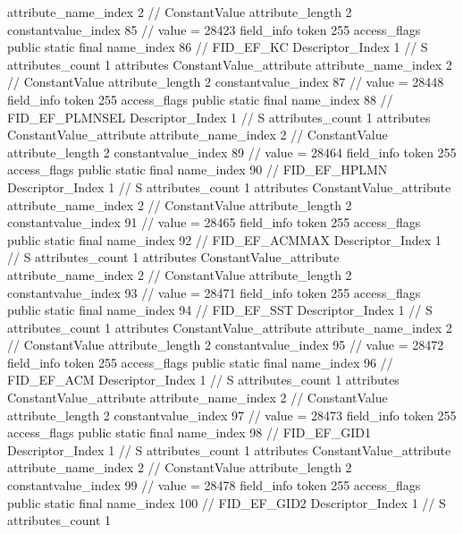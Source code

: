 {{{{{{{					attribute_name_index	2		// ConstantValue
					attribute_length	2
					constantvalue_index	85		// value = 28423
				}
				}
			}
			field_info {
				token	255
				access_flags	public static final
				name_index	86		// FID_EF_KC
				Descriptor_Index	1		// S
				attributes_count	1
				attributes {
				ConstantValue_attribute {
					attribute_name_index	2		// ConstantValue
					attribute_length	2
					constantvalue_index	87		// value = 28448
				}
				}
			}
			field_info {
				token	255
				access_flags	public static final
				name_index	88		// FID_EF_PLMNSEL
				Descriptor_Index	1		// S
				attributes_count	1
				attributes {
				ConstantValue_attribute {
					attribute_name_index	2		// ConstantValue
					attribute_length	2
					constantvalue_index	89		// value = 28464
				}
				}
			}
			field_info {
				token	255
				access_flags	public static final
				name_index	90		// FID_EF_HPLMN
				Descriptor_Index	1		// S
				attributes_count	1
				attributes {
				ConstantValue_attribute {
					attribute_name_index	2		// ConstantValue
					attribute_length	2
					constantvalue_index	91		// value = 28465
				}
				}
			}
			field_info {
				token	255
				access_flags	public static final
				name_index	92		// FID_EF_ACMMAX
				Descriptor_Index	1		// S
				attributes_count	1
				attributes {
				ConstantValue_attribute {
					attribute_name_index	2		// ConstantValue
					attribute_length	2
					constantvalue_index	93		// value = 28471
				}
				}
			}
			field_info {
				token	255
				access_flags	public static final
				name_index	94		// FID_EF_SST
				Descriptor_Index	1		// S
				attributes_count	1
				attributes {
				ConstantValue_attribute {
					attribute_name_index	2		// ConstantValue
					attribute_length	2
					constantvalue_index	95		// value = 28472
				}
				}
			}
			field_info {
				token	255
				access_flags	public static final
				name_index	96		// FID_EF_ACM
				Descriptor_Index	1		// S
				attributes_count	1
				attributes {
				ConstantValue_attribute {
					attribute_name_index	2		// ConstantValue
					attribute_length	2
					constantvalue_index	97		// value = 28473
				}
				}
			}
			field_info {
				token	255
				access_flags	public static final
				name_index	98		// FID_EF_GID1
				Descriptor_Index	1		// S
				attributes_count	1
				attributes {
				ConstantValue_attribute {
					attribute_name_index	2		// ConstantValue
					attribute_length	2
					constantvalue_index	99		// value = 28478
				}
				}
			}
			field_info {
				token	255
				access_flags	public static final
				name_index	100		// FID_EF_GID2
				Descriptor_Index	1		// S
				attributes_count	1
}}}}}
